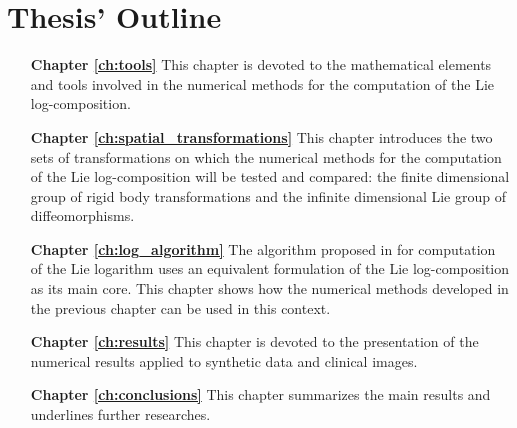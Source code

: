  \section{Thesis' Outline}\label{se:thesis_outline}
 \begin{enumerate}
 	
 	\item[{\bf Chapter \ref{ch:tools}}] This chapter is devoted to the mathematical elements and tools involved in the numerical methods for the computation of the Lie log-composition.
 	
 	\item[{\bf Chapter \ref{ch:spatial_transformations}}] This chapter introduces the two sets of transformations on which the numerical methods for the computation of the Lie log-composition will be tested and compared: the finite dimensional group of rigid body transformations and the infinite dimensional Lie group of diffeomorphisms.
 	
 	\item[{\bf Chapter \ref{ch:log_algorithm}}] The algorithm proposed in \cite{bossa2008algorithms} for computation of the Lie logarithm uses an equivalent formulation of the Lie log-composition as its main core. This chapter shows how the numerical methods developed in the previous chapter can be used in this context.
 	
 	\item[{\bf Chapter \ref{ch:results}}] This chapter is devoted to the presentation of the numerical results applied to synthetic data and clinical images. 
 	
 	\item[{\bf Chapter \ref{ch:conclusions}}] This chapter summarizes the main results and underlines further researches.
 	
 \end{enumerate}


